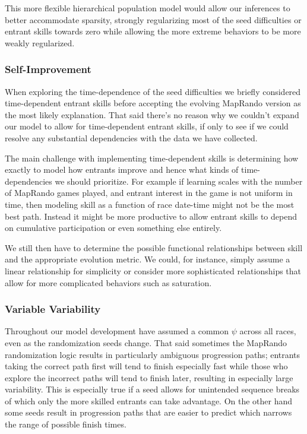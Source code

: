 \documentclass[
  letterpaper,
  DIV=11,
  numbers=noendperiod]{scrartcl}
\begin{document}
This more flexible hierarchical population model would allow our
inferences to better accommodate sparsity, strongly regularizing most of
the seed difficulties or entrant skills towards zero while allowing the
more extreme behaviors to be more weakly regularized.

\subsubsection{Self-Improvement}\label{self-improvement}

When exploring the time-dependence of the seed difficulties we briefly
considered time-dependent entrant skills before accepting the evolving
MapRando version as the most likely explanation. That said there's no
reason why we couldn't expand our model to allow for time-dependent
entrant skills, if only to see if we could resolve any substantial
dependencies with the data we have collected.

The main challenge with implementing time-dependent skills is
determining how exactly to model how entrants improve and hence what
kinds of time-dependencies we should prioritize. For example if learning
scales with the number of MapRando games played, and entrant interest in
the game is not uniform in time, then modeling skill as a function of
race date-time might not be the most best path. Instead it might be more
productive to allow entrant skills to depend on cumulative participation
or even something else entirely.

We still then have to determine the possible functional relationships
between skill and the appropriate evolution metric. We could, for
instance, simply assume a linear relationship for simplicity or consider
more sophisticated relationships that allow for more complicated
behaviors such as saturation.

\subsubsection{Variable Variability}\label{variable-variability}

Throughout our model development have assumed a common \(\psi\) across
all races, even as the randomization seeds change. That said sometimes
the MapRando randomization logic results in particularly ambiguous
progression paths; entrants taking the correct path first will tend to
finish especially fast while those who explore the incorrect paths will
tend to finish later, resulting in especially large variability. This is
especially true if a seed allows for unintended sequence breaks of which
only the more skilled entrants can take advantage. On the other hand
some seeds result in progression paths that are easier to predict which
narrows the range of possible finish times.
\end{document}
